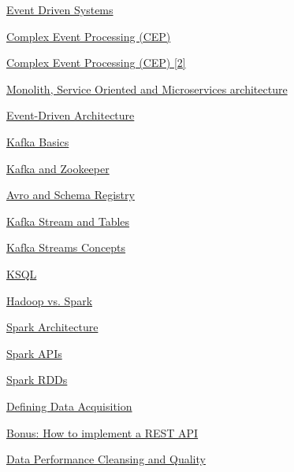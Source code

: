 \documentclass[10pt,a4paper]{article}
\begin{document}
\begin{thebibliography}{1}
\newblock \href{https://medium.com/omarelgabrys-blog/event-driven-systems-cdbe5a4b3d04}{Event Driven Systems}

\newblock \href{https://databricks.com/glossary/complex-event-processing}{Complex Event Processing (CEP)}

\newblock \href{https://datainsights.de/complex-event-processing}{Complex Event Processing (CEP) [2]}

\newblock \href{https://rubygarage.org/blog/monolith-soa-microservices-serverless}{Monolith, Service Oriented and Microservices architecture}

\newblock \href{https://aws.amazon.com/it/event-driven-architecture/}{Event-Driven Architecture}

\newblock \href{https://kafka.apache.org/intro}{Kafka Basics}

\newblock \href{https://www.cloudkarafka.com/blog/2018-07-04-cloudkarafka_what_is_zookeeper.html}{Kafka and Zookeeper}

\newblock \href{https://aseigneurin.github.io/2018/08/02/kafka-tutorial-4-avro-and-schema-registry.html}{Avro and Schema Registry}

\newblock \href{https://www.confluent.io/blog/kafka-streams-tables-part-1-event-streaming/}{Kafka Stream and Tables}

\newblock \href{https://docs.confluent.io/current/streams/concepts.html}{Kafka Streams Concepts}

\newblock \href{https://www.confluent.io/blog/ksql-streaming-sql-for-apache-kafka/}{KSQL}

\newblock \href{https://phoenixnap.com/kb/hadoop-vs-spark}{Hadoop vs. Spark}

\newblock \href{https://www.edureka.co/blog/spark-architecture/}{Spark Architecture}

\newblock \href{https://databricks.com/blog/2016/07/14/a-tale-of-three-apache-spark-apis-rdds-dataframes-and-datasets.html}{Spark APIs}

\newblock \href{https://intellipaat.com/blog/tutorial/spark-tutorial/programming-with-rdds/}{Spark RDDs}

\newblock \href{https://www.firstsanfranciscopartners.com/blog/defining-data-acquisition-importance/?cn-reloaded=1}{Defining Data Acquisition}

\newblock \href{https://medium.com/swlh/how-to-rest-api-a-tale-of-node-js-express-and-typescript-77bc598b280c}{Bonus: How to implement a REST API}

\newblock \href{http://www.wideskills.com/data-warehousing/data-performance-cleansing-and-quality}{Data Performance Cleansing and Quality}

\end{thebibliography}
\end{document}
